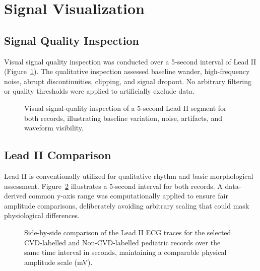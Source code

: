 \documentclass[11pt, a4paper]{article}
\begin{document}
\section{Signal Visualization}

\subsection{Signal Quality Inspection}
Visual signal quality inspection was conducted over a 5-second interval of Lead II (Figure~\ref{fig:sqi}). The qualitative inspection assessed baseline wander, high-frequency noise, abrupt discontinuities, clipping, and signal dropout. No arbitrary filtering or quality thresholds were applied to artificially exclude data. 

\begin{figure}[htbp]
    \centering
    \caption{Visual signal-quality inspection of a 5-second Lead II segment for both records, illustrating baseline variation, noise, artifacts, and waveform visibility.}
    \label{fig:sqi}
\end{figure}

\subsection{Lead II Comparison}
Lead II is conventionally utilized for qualitative rhythm and basic morphological assessment. Figure~\ref{fig:leadII_comparison} illustrates a 5-second interval for both records. A data-derived common y-axis range was computationally applied to ensure fair amplitude comparisons, deliberately avoiding arbitrary scaling that could mask physiological differences.

\begin{figure}[htbp]
    \centering
    \caption{Side-by-side comparison of the Lead II ECG traces for the selected CVD-labelled and Non-CVD-labelled pediatric records over the same time interval in seconds, maintaining a comparable physical amplitude scale (mV).}
    \label{fig:leadII_comparison}
\end{figure}
\end{document}
